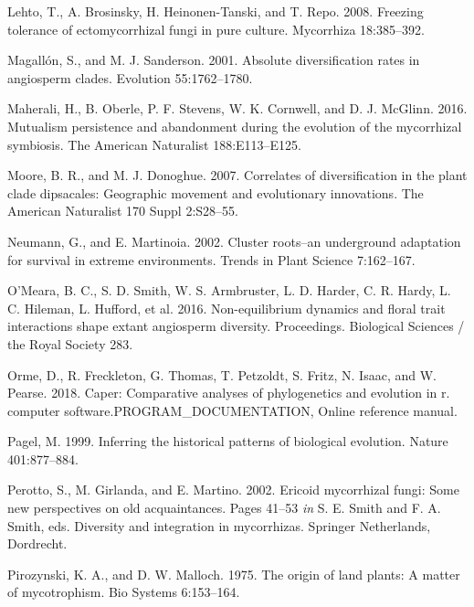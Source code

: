 \documentclass[12pt,]{article}
\begin{document}
\leavevmode\hypertarget{ref-lehto_2008}{}%
Lehto, T., A. Brosinsky, H. Heinonen-Tanski, and T. Repo. 2008. Freezing
tolerance of ectomycorrhizal fungi in pure culture. Mycorrhiza
18:385--392.

\leavevmode\hypertarget{ref-magalln_2001}{}%
Magallón, S., and M. J. Sanderson. 2001. Absolute diversification rates
in angiosperm clades. Evolution 55:1762--1780.

\leavevmode\hypertarget{ref-maherali_2016}{}%
Maherali, H., B. Oberle, P. F. Stevens, W. K. Cornwell, and D. J.
McGlinn. 2016. Mutualism persistence and abandonment during the
evolution of the mycorrhizal symbiosis. The American Naturalist
188:E113--E125.

\leavevmode\hypertarget{ref-moore_2007}{}%
Moore, B. R., and M. J. Donoghue. 2007. Correlates of diversification in
the plant clade dipsacales: Geographic movement and evolutionary
innovations. The American Naturalist 170 Suppl 2:S28--55.

\leavevmode\hypertarget{ref-neumann_2002}{}%
Neumann, G., and E. Martinoia. 2002. Cluster roots--an underground
adaptation for survival in extreme environments. Trends in Plant Science
7:162--167.

\leavevmode\hypertarget{ref-omeara_2016}{}%
O'Meara, B. C., S. D. Smith, W. S. Armbruster, L. D. Harder, C. R.
Hardy, L. C. Hileman, L. Hufford, et al. 2016. Non-equilibrium dynamics
and floral trait interactions shape extant angiosperm diversity.
Proceedings. Biological Sciences / the Royal Society 283.

\leavevmode\hypertarget{ref-orme_software_2018}{}%
Orme, D., R. Freckleton, G. Thomas, T. Petzoldt, S. Fritz, N. Isaac, and
W. Pearse. 2018. Caper: Comparative analyses of phylogenetics and
evolution in r. computer software.PROGRAM\_DOCUMENTATION, Online
reference manual.

\leavevmode\hypertarget{ref-pagel_1999}{}%
Pagel, M. 1999. Inferring the historical patterns of biological
evolution. Nature 401:877--884.

\leavevmode\hypertarget{ref-perotto_2002}{}%
Perotto, S., M. Girlanda, and E. Martino. 2002. Ericoid mycorrhizal
fungi: Some new perspectives on old acquaintances. Pages 41--53
\emph{in} S. E. Smith and F. A. Smith, eds. Diversity and integration in
mycorrhizas. Springer Netherlands, Dordrecht.

\leavevmode\hypertarget{ref-pirozynski_1975}{}%
Pirozynski, K. A., and D. W. Malloch. 1975. The origin of land plants: A
matter of mycotrophism. Bio Systems 6:153--164.
\end{document}
